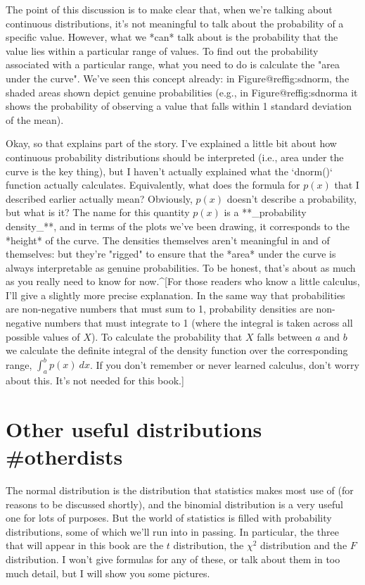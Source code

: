 The point of this discussion is to make clear that, when we're talking about continuous distributions, it's not meaningful to talk about the probability of a specific value. However, what we *can* talk about is the probability that the value lies within a particular range of values. To find out the probability associated with a particular range, what you need to do is calculate the "area under the curve". We've seen this concept already: in Figure@reffig:sdnorm, the shaded areas shown depict genuine probabilities (e.g., in Figure@reffig:sdnorma it shows the probability of observing a value that falls within 1 standard deviation of the mean). 

Okay, so that explains part of the story. I've explained a little bit about how continuous probability distributions should be interpreted (i.e., area under the curve is the key thing), but I haven't actually explained what the `dnorm()` function actually calculates. Equivalently, what does the formula for $p(x)$ that I described earlier actually mean? Obviously, $p(x)$ doesn't describe a probability, but what is it? The name for this quantity $p(x)$ is a **_probability density_**, and in terms of the plots we've been drawing, it corresponds to the *height* of the curve. The densities themselves aren't meaningful in and of themselves: but they're "rigged" to ensure that the *area* under the curve is always interpretable as genuine probabilities. To be honest, that's about as much as you really need to know for now.^[For those readers who know a little calculus, I'll give a slightly more precise explanation. In the same way that probabilities are non-negative numbers that must sum to 1, probability densities are non-negative numbers that must integrate to 1 (where the integral is taken across all possible values of $X$). To calculate the probability that $X$ falls between $a$ and $b$ we calculate the definite integral of the density function over the corresponding range, $\int_a^b p(x) \ dx$. If you don't remember or never learned calculus, don't worry about this. It's not needed for this book.]




\section{Other useful distributions {#otherdists}}

The normal distribution is the distribution that statistics makes most use of (for reasons to be discussed shortly), and the binomial distribution is a very useful one for lots of purposes. But the world of statistics is filled with probability distributions, some of which we'll run into in passing. In particular, the three that will appear in this book are the $t$ distribution, the $\chi^2$ distribution and the $F$ distribution. I won't give formulas for any of these, or talk about them in too much detail, but I will show you some pictures. 


